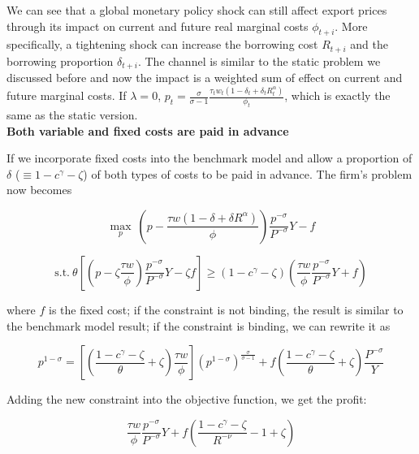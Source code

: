We can see that a global monetary policy shock can still affect export prices through its impact on current and future real marginal costs $\phi_{t+i}$. More specifically, a tightening shock can increase the borrowing cost $R_{t+i}$ and the borrowing proportion $\delta_{t+i}$. The channel is similar to the static problem we discussed before and now the impact is a weighted sum of effect on current and future marginal costs. If $\lambda=0$, $p_t=\frac{\sigma}{\sigma-1}\frac{\tau_{t} w_{t}(1-\delta_{t}+\delta_{t} R_{t}^\alpha)}{\phi_{t}}$, which is exactly the same as the static version. \\





\textbf{Both variable and fixed costs are paid in advance}

If we incorporate fixed costs into the benchmark model and allow a proportion of $\delta$ ($\equiv 1-c^{\gamma}-\zeta$) of both types of costs to be paid in advance. The firm's problem now becomes

$$
\max_{p} \ (p- \frac{\tau w(1-\delta+\delta R^\alpha)}{\phi}) \frac{p^{-\sigma}}{P^{-\sigma}} Y-f
$$

\begin{equation}
\text{s.t.} \ \theta [(p -\zeta \frac{\tau w}{\phi}) \frac{p^{-\sigma}}{P^{-\sigma}} Y -\zeta f ]\geq(1-c^\gamma-\zeta) (\frac{\tau w}{\phi} \frac{p^{-\sigma}}{P^{-\sigma}} Y+f)
\end{equation}

where $f$ is the fixed cost; if the constraint is not binding, the result is similar to the benchmark model result; if the constraint is binding, we can rewrite it as 

\begin{equation}\label{eq:constraint_fixedcost}
p^{1-\sigma}=[(\frac{1-c^{\gamma}-\zeta}{\theta}+\zeta)\frac{\tau w}{\phi}] (p^{1-\sigma})^{\frac{\sigma}{\sigma-1}}+f(\frac{1-c^{\gamma}-\zeta}{\theta}+\zeta)\frac{P^{-\sigma}}{Y}
\end{equation}

Adding the new constraint into the objective function, we get the profit: 

\begin{equation}
[\frac{1-c^\gamma-\zeta}{R^{-\nu}}-c^\gamma-(1-c^\gamma-\zeta)R^{\alpha}]\frac{\tau w}{\phi} \frac{p^{-\sigma}}{P^{-\sigma}}Y+f(\frac{1-c^\gamma-\zeta}{R^{-\nu}}-1+\zeta)
\end{equation}



